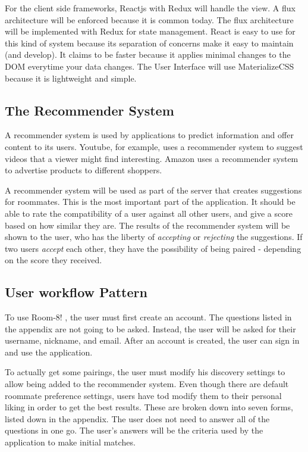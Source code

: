 \documentclass[journal]{IEEEtran}
\newcommand{\APPNAME}{Room-8! }
\begin{document}
For the client side frameworks, Reactjs with Redux will handle the view. A flux architecture will be enforced because it
is common today. The flux architecture will be implemented with Redux for state management. React is easy to use for
this kind of system because its separation of concerns make it easy to maintain (and develop). It claims to be faster
because it applies minimal changes to the DOM everytime your data changes. The User Interface will use MaterializeCSS
because it is lightweight and simple.

\subsection{The Recommender System}
A recommender system is used by applications to predict information and offer content to its users\cite{katarya}.
Youtube, for example, uses a recommender system to suggest videos that a viewer might find interesting. Amazon uses a
recommender system to advertise products to different shoppers.

A recommender system will be used as part of the server that creates suggestions for roommates. This is the most
important part of the application. It should be able to rate the compatibility of a user against all other users, and
give a score based on how similar they are. The results of the recommender system will be shown to the user, who has the
liberty of \textit{accepting} or \textit{rejecting} the suggestions. If two users \textit{accept} each other, they have
the possibility of being paired - depending on the score they received.

\subsection{User workflow Pattern}

To use \APPNAME , the user must first create an account. The questions listed in the appendix are not going to be asked.
Instead, the user will be asked for their username, nickname, and email. After an account is created, the
user can sign in and use the application.

To actually get some pairings, the user must modify his discovery settings to allow being added to the recommender
system. Even though there are default roommate preference settings, users have tod modify them to their personal liking
in order to get the best results. These are broken down into seven forms, listed down in the appendix. The user does not
need to answer all of the questions in one go. The user's answers will be the criteria used by the application to make
initial matches. 
\end{document}
